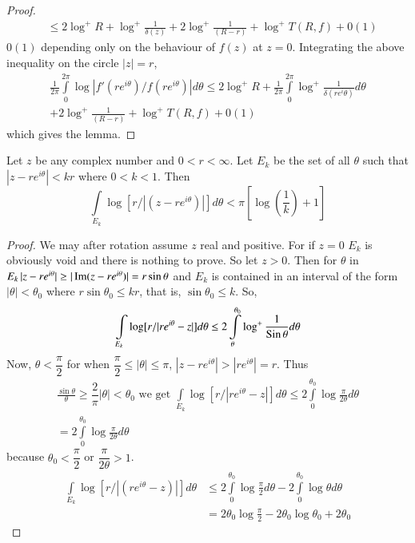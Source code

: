 \begin{proof}
\begin{align*}
&\leq
2\log^{+}R+\log^{+}\frac{1}{\delta(z)}+2\log^{+}\frac{1}{(R-r)}+\log^{+}T(R,f)+0(1) 
\end{align*}\pageoriginale
$0(1)$ depending only on the behaviour of $f(z)$ at $z=0$. Integrating
the above inequality on the circle $|z|=r$,
\begin{gather*}
\frac{1}{2\pi}\int\limits^{2\pi}_{0}\log|f'(re^{i\theta}) /
f(re^{i\theta})|d\theta\leq 2\log^{+}R+\frac{1}{2\pi}
\int\limits^{2\pi}_{0}\log^{+}\frac{1}{\delta(re^{i}\theta)}d\theta\\ 
+2\log^{+}\frac{1}{(R-r)}+\log^{+}T(R,f)+0(1)
\end{gather*}
which gives the lemma.
\end{proof}

\begin{lem}\label{part2-lem2}
Let $z$ be any complex number and $0<r<\infty$. Let $E_{k}$ be the set
of all $\theta$ such that $|z-re^{i\theta}|<kr$ where $0<k<1$. Then
$$
\int\limits_{E_{k}}\log[r/|(z-re^{i\theta})|]d\theta <\pi
\left[\log\left(\frac{1}{k}\right)+1\right] 
$$
\end{lem}

\begin{proof}
We may after rotation assume $z$ real and positive. For if $z=0$
$E_{k}$ is obviously void and there is nothing to prove. So let
$z>0$. Then for $\theta$ in $E_{k}\, |z-re^{i\theta}|\geq
|\operatorname{Im}(z-re^{i\theta})|=r\sin\theta$ and $E_{k}$ is contained in an
interval of the form $|\theta|<\theta_{0}$ where $r\sin\theta_{0}\leq
kr$, that is, $\sin\theta_{0}\leq k$. So,
$$
\int\limits_{E_{k}}\log [r/|re^{i\theta}-z|]d\theta\leq
2\int\limits^{\theta_{0}}_{\theta}\log^{+}\frac{1}{\operatorname{Sin}\theta}d\theta
$$
Now, $\theta<\dfrac{\pi}{2}$ for when $\dfrac{\pi}{2}\leq |\theta|\leq
\pi$, $|z-re^{i\theta}|>|re^{i\theta}|=r$. Thus\pageoriginale
\begin{multline*}
\frac{\sin \theta}{\theta}\geq \dfrac{2}{\pi}|\theta|<\theta_{0}
\text{ \ we get \ } \int\limits_{E_{k}}\log
     [r/|re^{i\theta}-z|]d\theta\leq
     2\int\limits^{\theta_{0}}_{0}\log\frac{\pi}{2\theta}d\theta\\
     =2\int\limits^{\theta_{0}}_{0}\log\frac{\pi}{2\theta}d\theta
     \qquad 
\end{multline*}
because $\theta_{0}<\dfrac{\pi}{2}$ or $\dfrac{\pi}{2\theta}>1$.
\begin{align*}
\int\limits_{E_{k}}\log [r/|(re^{i\theta}-z)|]d\theta &\leq
2\int\limits^{\theta_{0}}_{0}\log\frac{\pi}{2}d\theta-2\int\limits^{\theta_{0}}_{0}\log\theta
d\theta\\
&=2\theta_{0}\log\frac{\pi}{2}-2\theta_{0}\log\theta_{0}+2\theta_{0}
\end{align*}
\end{proof}

